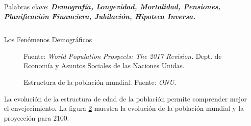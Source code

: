 \documentclass[]{beamer}
\begin{document}
\begin{frame}{\vspace{1ex}\hfill Palabras clave: \bfseries \textit{Demograf\'ia, Longevidad, Mortalidad, Pensiones, Planificaci\'on Financiera, Jubilaci\'on, Hipoteca Inversa.}}
\begin{columns}[t]
\begin{block}{Los Fen\'omenos Demogr\'aficos}
\begin{multicols}{2}
				\begin{figure}[h]
					\centering
					\caption{\small Fuente: \textit{World Population Prospects: The 2017 Revision.}  Dept. de Econom\'ia y Asuntos Sociales de las Naciones Unidas.}
					\label{fertilidad}
				\end{figure}
				\begin{figure}[h]
					\centering
					\caption{\small Estructura de la poblaci\'on mundial. Fuente: \textit{ONU.}}
					\label{piramide}
					\end{figure}
					\vspace{-0.4cm}
				La evoluci\'on de la estructura de edad de la poblaci\'on permite comprender mejor el envejecimiento. La figura \ref{piramide} muestra la evoluci\'on de la poblaci\'on mundial y la proyecci\'on para 2100.

\end{multicols}
\end{block}
\end{columns}
\end{frame}
\end{document}
